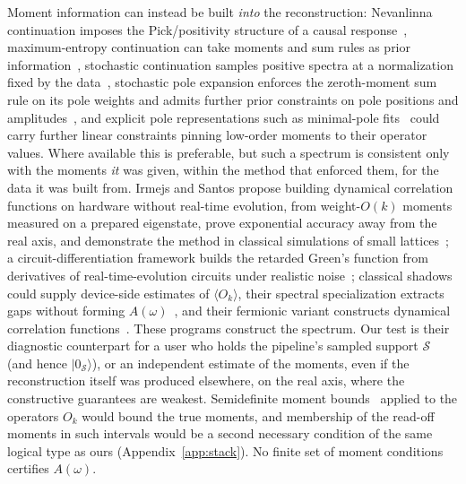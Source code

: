 \documentclass[submission, PhysCore]{SciPost}
\begin{document}
Moment information can instead be built \emph{into} the reconstruction: Nevanlinna continuation imposes the Pick/positivity structure of a causal response~\cite{Fei2021}, maximum-entropy continuation can take moments and sum rules as prior information~\cite{Jarrell1996}, stochastic continuation samples positive spectra at a normalization fixed by the data~\cite{Sandvik1998}, stochastic pole expansion enforces the zeroth-moment sum rule on its pole weights and admits further prior constraints on pole positions and amplitudes~\cite{HuangLiang2023}, and explicit pole representations such as minimal-pole fits~\cite{ZhangGull2024} could carry further linear constraints pinning low-order moments to their operator values. Where available this is preferable, but such a spectrum is consistent only with the moments \emph{it} was given, within the method that enforced them, for the data it was built from. Irmejs and Santos propose building dynamical correlation functions on hardware without real-time evolution, from weight-$O(k)$ moments measured on a prepared eigenstate, prove exponential accuracy away from the real axis, and demonstrate the method in classical simulations of small lattices~\cite{IrmejsSantos2025}; a circuit-differentiation framework builds the retarded Green's function from derivatives of real-time-evolution circuits under realistic noise~\cite{Piccinelli2026}; classical shadows~\cite{HuangKuengPreskill2020,HuangScience2022} could supply device-side estimates of $\langle O_k\rangle$, their spectral specialization extracts gaps without forming $A(\omega)$~\cite{ShadowSpec2025}, and their fermionic variant constructs dynamical correlation functions~\cite{FAST2025}. These programs construct the spectrum. Our test is their diagnostic counterpart for a user who holds the pipeline's sampled support $\mathcal S$ (and hence $|0_\mathcal S\rangle$), or an independent estimate of the moments, even if the reconstruction itself was produced elsewhere, on the real axis, where the constructive guarantees are weakest. Semidefinite moment bounds~\cite{WangAcin2024,Mortimer2026} applied to the operators $O_k$ would bound the true moments, and membership of the read-off moments in such intervals would be a second necessary condition of the same logical type as ours (Appendix~\ref{app:stack}). No finite set of moment conditions certifies $A(\omega)$.
\end{document}
